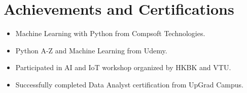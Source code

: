 \documentclass[letterpaper,11pt]{article}
\newcommand{\resumeItem}[1]{
  \item\small{
    {#1 \vspace{-2pt}}
  }
}
\newcommand{\resumeItemListStart}{\begin{itemize}}
\newcommand{\resumeItemListEnd}{\end{itemize}\vspace{-5pt}}
\begin{document}
\section{Achievements and Certifications}
\resumeItemListStart
  \resumeItem{Machine Learning with Python from Compsoft Technologies.}
  \resumeItem{Python A-Z and Machine Learning from Udemy.}
  \resumeItem{Participated in AI and IoT workshop organized by HKBK and VTU.}
  \resumeItem{Successfully completed Data Analyst certification from UpGrad Campus.}
\resumeItemListEnd
\end{document}
